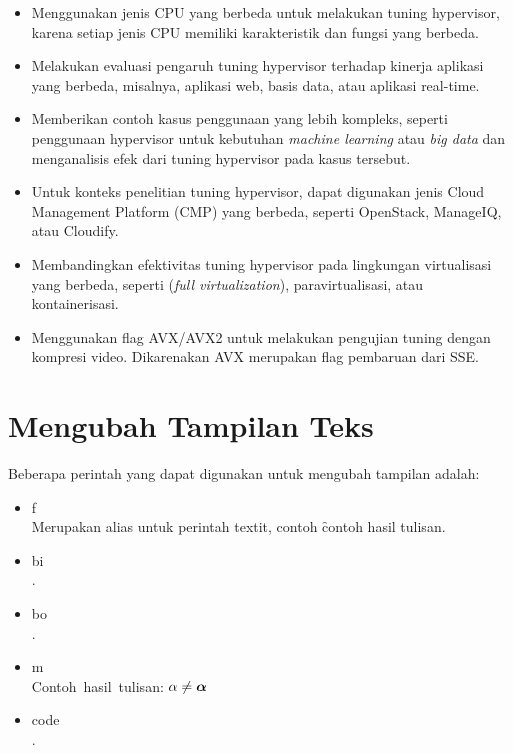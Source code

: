 \begin{itemize}
	\item Menggunakan jenis CPU yang berbeda untuk melakukan tuning hypervisor, karena setiap jenis CPU memiliki karakteristik dan fungsi yang berbeda.
	\item Melakukan evaluasi pengaruh tuning hypervisor terhadap kinerja aplikasi yang berbeda, misalnya, aplikasi web, basis data, atau aplikasi real-time.
	\item Memberikan contoh kasus penggunaan yang lebih kompleks, seperti penggunaan hypervisor untuk kebutuhan \textit{machine learning} atau \textit{big data} dan menganalisis efek dari tuning hypervisor pada kasus tersebut.
	\item Untuk konteks penelitian tuning hypervisor, dapat digunakan jenis Cloud Management Platform (CMP) yang berbeda, seperti OpenStack, ManageIQ, atau Cloudify.
	\item Membandingkan efektivitas tuning hypervisor pada lingkungan virtualisasi yang berbeda, seperti (\textit{full virtualization}), paravirtualisasi, atau kontainerisasi.
	\item Menggunakan flag AVX/AVX2 untuk melakukan pengujian tuning dengan kompresi video. Dikarenakan AVX merupakan flag pembaruan dari SSE.
\end{itemize}

\iffalse
	\section{Mengubah Tampilan Teks}
	Beberapa perintah yang dapat digunakan untuk mengubah tampilan adalah:
	\begin{itemize}
		\item \bslash f \\
		      Merupakan alias untuk perintah \bslash textit, contoh
		      \f{contoh hasil tulisan}.
		\item \bslash bi \\
		      .
		\item \bslash bo \\
		      .
		\item \bslash m \\
		      Contoh\ hasil\ tulisan: $\alpha \not= \bm{\alpha}$
		\item \bslash code \\
		      .
	\end{itemize}



